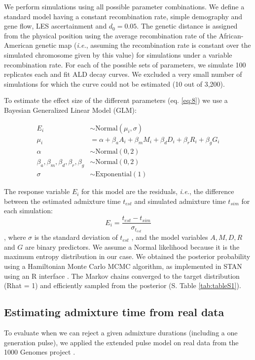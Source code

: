 \documentclass[]{article}
\begin{document}
We perform simulations using all possible parameter combinations.
We define a standard model having a constant recombination rate, simple demography and gene flow, LES ascertainment and $d_0 = 0.05$.
The genetic distance is assigned from the physical  position using the average recombination rate of the African-American genetic map (\emph{i.e.}, assuming the recombination rate is constant over the simulated chromosome given by this value) for simulations under a variable recombination rate.
For each of the possible sets of parameters, we simulate 100 replicates each and fit ALD decay curves. We excluded a very small number of simulations for which the curve could not be estimated (10 out of 3,200). 



To estimate the effect size of the different parameters (eq.
\ref{eq:8}) we use a Bayesian Generalized Linear Model (GLM):

\begin{equation}\label{eq:8}
\begin{split}
E_i &\sim \text{Normal}(\mu_i,\sigma) \\
\mu_i &= \alpha + \beta_aA_i + \beta_mM_i + \beta_dD_i + \beta_rR_i + \beta_gG_i \\
\alpha &\sim \text{Normal}(0,2) \\
\beta_a,\beta_m,\beta_d,\beta_r,\beta_g &\sim \text{Normal}(0,2) \\
\sigma &\sim \text{Exponential}(1)
\end{split}
\end{equation}

The response variable $E_i$ for this model are the residuals, \emph{i.e.}, the difference between the estimated admixture time $t_{est}$ and simulated admixture time $t_{sim}$ for each simulation:
$$E_i = \frac{t_{est} - t_{sim}}{\sigma_{t_{est}}}$$, where $\sigma$ is the standard deviation of $t_{est}$ , and the model variables $A, M, D, R$ and $G$ are binary predictors.
We assume a Normal likelihood because it is the maximum entropy distribution in our case. We obtained the posterior probability using a Hamiltonian Monte Carlo MCMC algorithm, as implemented in STAN \citep{carpenter_stan_2017} using an R interface \citep{stan_development_team_rstan_2018,mcelreath_statistical_2020}. The Markov chains converged to the target distribution (Rhat = 1) and efficiently sampled from the posterior (S. Table \ref{tab:tableS1}).  



\subsection{Estimating admixture time from real data}\label{Estimating admixture time from real data}
To evaluate when we can reject a given admixture durations (including a one generation pulse), we applied the extended pulse model on real data from the 1000 Genomes project \citep{the_1000_genomes_project_consortium_global_2015}.
\end{document}
